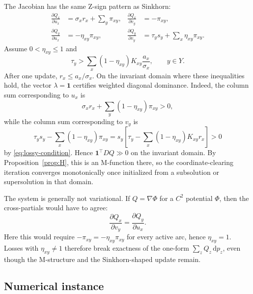 \documentclass[11pt]{article}
\newcommand{\one}{\mathbf{1}}
\newcommand{\dd}{\mathrm{d}}
\theoremstyle{definition}
\theoremstyle{plain}
\begin{document}
The Jacobian has the same Z-sign pattern as Sinkhorn:
\begin{align*}
        \frac{\partial Q_x}{\partial u_x}
        &=\sigma_xr_x+\sum_y\pi_{xy},
        &\frac{\partial Q_x}{\partial v_y}
        &=-\pi_{xy},\\
        \frac{\partial Q_y}{\partial u_x}
        &=-\eta_{xy}\pi_{xy},
        &\frac{\partial Q_y}{\partial v_y}
        &=\tau_ys_y+\sum_x\eta_{xy}\pi_{xy}.
\end{align*}
Assume $0<\eta_{xy}\leq1$ and
\begin{equation}\label{eq:lossy-condition}
        \tau_y>
        \sum_x(1-\eta_{xy})K_{xy}\frac{a_x}{\sigma_x},
        \qquad y\in Y.
\end{equation}
After one update, $r_x\leq a_x/\sigma_x$. On the invariant domain where these inequalities hold, the vector $\lambda=\one$ certifies weighted diagonal dominance. Indeed, the column sum corresponding to $u_x$ is
\[
        \sigma_xr_x+
        \sum_y(1-\eta_{xy})\pi_{xy}>0,
\]
while the column sum corresponding to $v_y$ is
\[
        \tau_ys_y-
        \sum_x(1-\eta_{xy})\pi_{xy}
        =s_y\left[\tau_y-
        \sum_x(1-\eta_{xy})K_{xy}r_x\right]>0
\]
by \eqref{eq:lossy-condition}. Hence $\one^\top DQ\gg0$ on the invariant domain. By Proposition~\ref{prop:H}, this is an M-function there, so the coordinate-clearing iteration converges monotonically once initialized from a subsolution or supersolution in that domain.

The system is generally not variational. If $Q=\nabla\Phi$ for a $C^2$ potential $\Phi$, then the cross-partials would have to agree:
\[
        \frac{\partial Q_x}{\partial v_y}
        =\frac{\partial Q_y}{\partial u_x}.
\]
Here this would require $-\pi_{xy}=-\eta_{xy}\pi_{xy}$ for every active arc, hence $\eta_{xy}=1$. Losses with $\eta_{xy}\neq1$ therefore break exactness of the one-form $\sum_z Q_z\,\dd p_z$, even though the M-structure and the Sinkhorn-shaped update remain.

\subsection*{Numerical instance}
\end{document}
